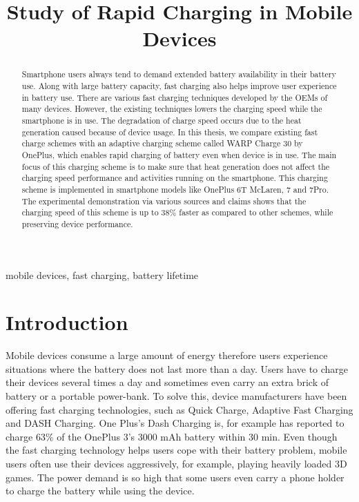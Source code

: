 \documentclass[conference]{IEEEtran}
\begin{document}
\title{Study of Rapid Charging in Mobile Devices}

\author{

}

\maketitle
\thispagestyle{plain}
\pagestyle{plain}

\begin{abstract}

Smartphone users always tend to demand extended battery
availability in their battery use. Along with large battery capacity, fast
charging also helps improve user experience in battery use. There are
various fast charging techniques developed by the OEMs of many devices.
However, the existing techniques lowers the charging speed while the
smartphone is in use. The degradation of charge speed occurs due to the
heat generation caused because of device usage. In this thesis, we compare
existing fast charge schemes with an adaptive charging scheme called
WARP Charge 30 by OnePlus, which enables rapid charging of battery
even when device is in use. The main focus of this charging scheme is to
make sure that heat generation does not affect the charging speed
performance and activities running on the smartphone. This charging
scheme is implemented in smartphone models like OnePlus 6T McLaren, 7
and 7Pro. The experimental demonstration via various sources and claims shows that
the charging speed of this scheme is up to 38\% faster as compared to other
schemes, while preserving device performance.

\end{abstract}

\begin{IEEEkeywords}
mobile devices, fast charging, battery lifetime
\end{IEEEkeywords}

\section{Introduction}

Mobile devices consume a large amount of energy therefore users experience situations where the battery does not last more than a day. Users have to charge their devices several times a day and sometimes even carry an extra brick of battery or a portable power-bank. To solve this, device manufacturers have
been offering fast charging technologies, such as Quick Charge\cite{b4}, Adaptive Fast Charging\cite{b5} and DASH Charging\cite{b6}. One Plus's Dash Charging is, for example has reported to charge 63\% of the OnePlus 3's 3000 mAh battery within 30 min. Even though the fast charging technology helps users cope with their battery problem, mobile users often use their devices aggressively, for example, playing heavily loaded 3D games. The power demand is so high that some users even carry a phone holder to charge the battery while using the device.   
\end{document}
